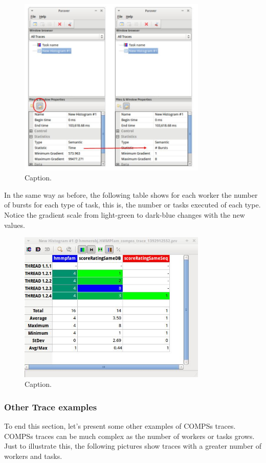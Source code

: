 \begin{figure}[ht!]
  \centering
    \includegraphics[width=0.8\textwidth]{./Sections/4_Tools/Figures/14.jpeg}
    \caption{Caption.}
\end{figure}

In the same way as before, the following table shows for each worker the number of bursts 
for each type of task, this is, the number or tasks executed of each type. Notice the gradient 
scale from light-green to dark-blue changes with the new values.

\begin{figure}[ht!]
  \centering
    \includegraphics[width=0.8\textwidth]{./Sections/4_Tools/Figures/15.jpeg}
    \caption{Caption.}
\end{figure}


\subsubsection{Other Trace examples}
To end this section, let’s present some other examples of COMPSs traces. COMPSs traces can be 
much complex as the number of workers or tasks grows. Just to illustrate this, the following 
pictures show traces with a greater number of workers and tasks.

